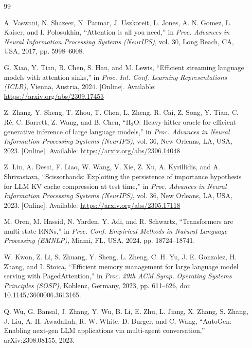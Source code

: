 \begin{thebibliography}{99}
{}

\setlength{\itemsep}{6pt}
\setlength{\parskip}{0pt}

A. Vaswani, N. Shazeer, N. Parmar, J. Uszkoreit, L. Jones, A. N. Gomez, {\L}. Kaiser, and I. Polosukhin,
``Attention is all you need,''
in \textit{Proc. Advances in Neural Information Processing Systems (NeurIPS)},
vol. 30, Long Beach, CA, USA, 2017, pp. 5998--6008.

G. Xiao, Y. Tian, B. Chen, S. Han, and M. Lewis,
``Efficient streaming language models with attention sinks,''
in \textit{Proc. Int. Conf. Learning Representations (ICLR)},
Vienna, Austria, 2024. [Online]. Available: \url{https://arxiv.org/abs/2309.17453}

Z. Zhang, Y. Sheng, T. Zhou, T. Chen, L. Zheng, R. Cai, Z. Song, Y. Tian, C. R\'e, C. Barrett, Z. Wang, and B. Chen,
``H$_2$O: Heavy-hitter oracle for efficient generative inference of large language models,''
in \textit{Proc. Advances in Neural Information Processing Systems (NeurIPS)},
vol. 36, New Orleans, LA, USA, 2023. [Online]. Available: \url{https://arxiv.org/abs/2306.14048}

Z. Liu, A. Desai, F. Liao, W. Wang, V. Xie, Z. Xu, A. Kyrillidis, and A. Shrivastava,
``Scissorhands: Exploiting the persistence of importance hypothesis for LLM KV cache compression at test time,''
in \textit{Proc. Advances in Neural Information Processing Systems (NeurIPS)},
vol. 36, New Orleans, LA, USA, 2023. [Online]. Available: \url{https://arxiv.org/abs/2305.17118}

M. Oren, M. Hassid, N. Yarden, Y. Adi, and R. Schwartz,
``Transformers are multi-state RNNs,''
in \textit{Proc. Conf. Empirical Methods in Natural Language Processing (EMNLP)},
Miami, FL, USA, 2024, pp. 18724--18741.

W. Kwon, Z. Li, S. Zhuang, Y. Sheng, L. Zheng, C. H. Yu, J. E. Gonzalez, H. Zhang, and I. Stoica,
``Efficient memory management for large language model serving with PagedAttention,''
in \textit{Proc. 29th ACM Symp. Operating Systems Principles (SOSP)},
Koblenz, Germany, 2023, pp. 611--626, doi: 10.1145/3600006.3613165.

Q. Wu, G. Bansal, J. Zhang, Y. Wu, B. Li, E. Zhu, L. Jiang, X. Zhang, S. Zhang, J. Liu, A. H. Awadallah, R. W. White, D. Burger, and C. Wang,
``AutoGen: Enabling next-gen LLM applications via multi-agent conversation,''
arXiv:2308.08155, 2023.


\end{thebibliography}
